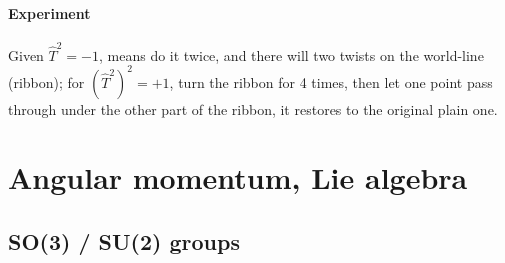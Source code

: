 \paragraph{Experiment}
Given $\hat T^2 = -1$, means do it twice, and there will two twists on the
world-line (ribbon); for $(\hat T^2)^2 = +1$, turn the ribbon for 4 times, then
let one point pass through under the other part of the ribbon, it restores to
the original plain one.

\section{Angular momentum, Lie algebra}

\subsection{SO(3) / SU(2) groups}

